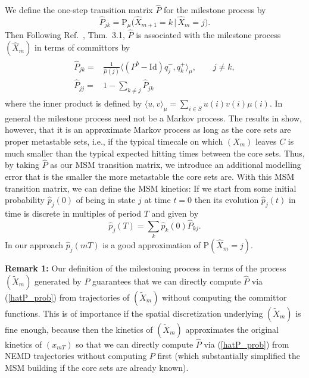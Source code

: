 \documentclass[aps, pre, preprint,unsortedaddress,a4paper,onecolumn]{revtex4}
\newcommand{\recheck}[1]{{\color{red} #1}}
\newcommand{\vect}[1]{#1}
\newcommand{\fwd}[0]{+}
\newcommand{\bwd}[0]{-}
\newcommand{\id}{\mathrm{Id}}
\newcommand{\prob}{\textrm{P}}
\begin{document}
\recheck{
We define the one-step transition matrix $\hat{\vect P}$ for the milestone process by
\begin{equation}\label{hatP_prob}
\hat{\vect P}_{jk}=\prob_\mu\Big(\hat{X}_{m+1}=k\,\vert\, \hat{X}_m=j\Big).
\end{equation}
Then Following
Ref.~\cite{djurdjevac2010markov}, Thm.~3.1, 
$\hat{\vect P}$ is associated with the milestone process $(\hat{X}_m)$ in terms of committors by}
  \begin{align}
    \label{eq:msm-tmatrix-00}
    \begin{split}      
    \hat{\vect P}_{jk}
    = &
    \frac{1}{\hat{\mu}(j)}
    \langle (\vect P^b - \id) q^\bwd_j,q^\fwd_k \rangle_\mu,\qquad j\not= k, \\    %
    \hat{\vect P}_{jj}
    =&
    1-\sum_{k\not=j} \hat{\vect P}_{jk}
    \end{split}
  \end{align}
where the inner product is defined by
$\langle u,v \rangle_\mu=\sum_{i\in S} u(i) v(i) \mu(i)$. 
In general the milestone process need not be a Markov process. The results in \cite{A19-31,sarich2014utilizing} show, however, that it is an approximate Markov process as long as the core sets are proper metastable sets, i.e., if the typical timecale on which $(X_m)$ leaves $C$ is much smaller than the typical expected hitting times between the core sets.
Thus, by taking $\hat{P}$ as our MSM transition matrix, we introduce an additional modelling error that is the smaller the more metastable the core sets are.
With this MSM transition matrix, we can define the MSM kinetics:
If we start from some initial probability $\hat{p}_j(0)$ of being in state $j$ at time $t=0$ then its evolution $\hat{p}_j(t)$ in time is discrete in multiples of period $T$ and given by
\recheck{
\begin{equation}\label{eq:num-29}
\hat{p}_j(T)=\sum_k \hat{p}_k(0)\hat{\vect P}_{kj}.
\end{equation}}
In our approach $\hat p_j(mT)$ is a good approximation of $\prob(\hat{X}_m=j)$.

\textbf{Remark 1:} Our definition of the milestoning process in terms of the process $(\tilde X_m)$ generated by $P$ guarantees that we can directly compute $\hat{P}$ via (\ref{hatP_prob})  from trajectories of $(\tilde X_m)$ without computing the committor functions. 
This is of importance if the spatial discretization underlying $(\tilde X_m)$ is fine enough, because then the kinetics of $(\tilde X_m)$
approximates the original kinetics of $(x_{mT})$ so that we can directly compute   $\hat{P}$ via (\ref{hatP_prob})  from NEMD trajectories without computing $P$ first (which substantially simplified the MSM building if the core sets are already known).
\end{document}
